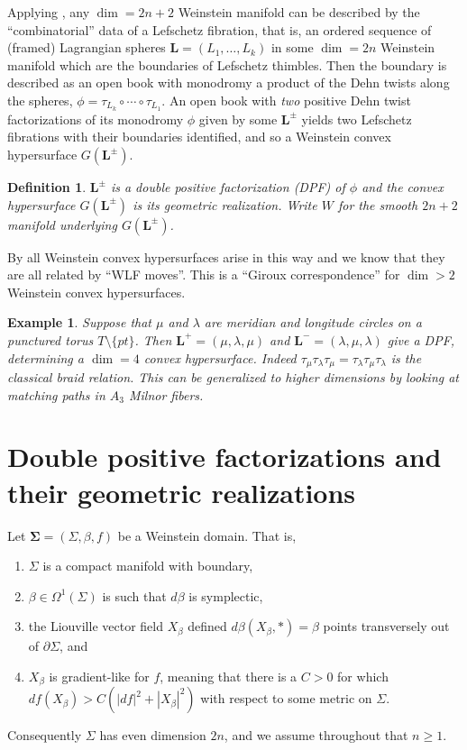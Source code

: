 \documentclass[11pt]{amsart}
\newcommand{\thicc}[1]{\pmb{#1}}
\newcommand{\be}{\begin{enumerate}}
\newcommand{\ee}{\end{enumerate}}
\newcommand{\LagTuple}{\thicc{L}}
\newtheorem{ex}[thm]{Example}
\newtheorem{defn}[thm]{Definition}
\begin{document}
Applying \cite{BHH:GirouxCorrespondence, GirouxPardon}, any $\dim = 2n+2$ Weinstein manifold can be described by the ``combinatorial'' data of a Lefschetz fibration, that is, an ordered sequence of (framed) Lagrangian spheres $\LagTuple = (L_{1}, \dots, L_{k})$ in some $\dim=2n$ Weinstein manifold which are the boundaries of Lefschetz thimbles. Then the boundary is described as an open book with monodromy a product of the Dehn twists along the spheres, $\phi = \tau_{L_{k}}\circ \cdots \circ \tau_{L_{1}}$. An open book with \emph{two} positive Dehn twist factorizations of its monodromy $\phi$ given by some $\LagTuple^{\pm}$ yields two Lefschetz fibrations with their boundaries identified, and so a Weinstein convex hypersurface $G(\LagTuple^{\pm})$. 

\begin{defn}
$\LagTuple^{\pm}$ is a \emph{double positive factorization} (DPF) of $\phi$ and the convex hypersurface $G(\LagTuple^{\pm})$ is its \emph{geometric realization}. Write $W$ for the smooth $2n+2$ manifold underlying $G(\LagTuple^{\pm})$.
\end{defn}

By \cite{BHH:GirouxCorrespondence} all Weinstein convex hypersurfaces arise in this way and we know that they are all related by ``WLF moves''. This is a ``Giroux correspondence'' for $\dim > 2$ Weinstein convex hypersurfaces.

\begin{ex}
Suppose that $\mu$ and $\lambda$ are meridian and longitude circles on a punctured torus $T \setminus \{ pt \}$. Then $\LagTuple^{+} = (\mu, \lambda, \mu)$ and $\LagTuple^{-} = (\lambda, \mu, \lambda)$ give a DPF, determining a $\dim=4$ convex hypersurface. Indeed $\tau_{\mu}\tau_{\lambda}\tau_{\mu} = \tau_{\lambda}\tau_{\mu}\tau_{\lambda}$ is the classical braid relation. This can be generalized to higher dimensions by looking at matching paths in $A_{3}$ Milnor fibers.
\end{ex}

\section{Double positive factorizations and their geometric realizations}

Let $\thicc{\Sigma} = (\Sigma, \beta, f)$ be a Weinstein domain. That is,
\be
\item $\Sigma$ is a compact manifold with boundary,
\item $\beta \in \Omega^{1}(\Sigma)$ is such that $d\beta$ is symplectic,
\item the Liouville vector field $X_{\beta}$ defined $d\beta(X_{\beta}, \ast) = \beta$ points transversely out of $\partial \Sigma$, and
\item $X_{\beta}$ is gradient-like for $f$, meaning that there is a $C > 0$ for which $df(X_{\beta}) > C(|df|^{2} + |X_{\beta}|^{2})$ with respect to some metric on $\Sigma$.
\ee
Consequently $\Sigma$ has even dimension $2n$, and we assume throughout that $n \geq 1$.
\end{document}
